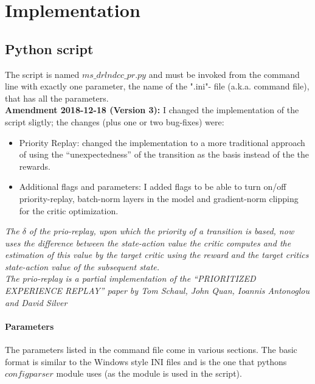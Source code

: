 \documentclass[a4paper]{article}
\begin{document}
\section{Implementation}
\subsection{Python script}
The script is named $ms\_drlndcc\_pr.py$ and must be invoked from the command
line with exactly one parameter, the name of the ".ini"- file (a.k.a. command file),
that has all the parameters.
\\
\textbf{Amendment 2018-12-18 (Version 3):} I changed the implementation
of the script sligtly; the changes (plus one or two bug-fixes) were:
\begin{itemize}
\item Priority Replay: changed the implementation to a more traditional approach
of using the \enquote{unexpectedness} of the transition as the basis instead
of the the rewards.
\item Additional flags and parameters: I added flags to be able to turn on/off
priority-replay, batch-norm layers in the model and gradient-norm clipping
for the critic optimization.
\end{itemize}

\textit{The $\delta$ of the prio-replay, upon which the priority of a transition
is based, now uses the difference between the state-action value the critic
computes and the estimation of this value by the target critic using the reward
and the target critics state-action value of the subsequent state.\\
The prio-replay is a partial implementation of the \enquote{PRIORITIZED EXPERIENCE REPLAY}
paper by Tom Schaul, John Quan, Ioannis Antonoglou and David Silver}

\paragraph{Parameters}
The parameters listed in the command file come in various sections. The basic format
is similar to the Windows style INI files and is the one that pythons $configparser$
module uses (as the module is used in the script).
\end{document}
